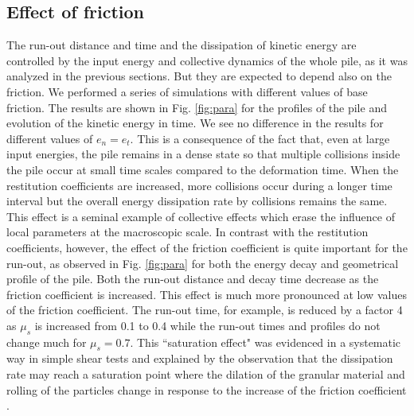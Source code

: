 \subsection{Effect of friction}
\label{sec:parameters}

The run-out distance and time and the dissipation of kinetic energy are 
controlled by the input energy and collective dynamics of the whole pile, as it 
was analyzed in the previous sections. But they are expected to depend also on 
the friction. We performed a series of simulations with different values of 
base friction. The results are shown in Fig. \ref{fig:para} for the profiles of 
the pile and evolution of the kinetic energy in time. We see no difference in 
the results for different values of $e_n = e_t$. This is a consequence of the 
fact that,  even at large input energies, the pile remains in a dense state so 
that multiple collisions inside the pile occur at small time scales compared to 
the deformation time. When the restitution coefficients are increased, more 
collisions occur during a longer time interval but the overall energy 
dissipation rate by collisions remains the same. This effect is a seminal 
example of collective effects which erase the influence of local parameters at 
the macroscopic scale. In contrast with the restitution coefficients, however, 
the effect of the friction coefficient is quite important for the run-out, as 
observed in Fig. \ref{fig:para} for both the energy decay and geometrical 
profile of the pile. Both the run-out distance and decay time decrease as the 
friction coefficient is increased. This effect is much more pronounced at low 
values of the friction coefficient. The run-out time, for example, is reduced 
by a factor 4 as $\mu_s$ is increased from 0.1 to 0.4 while the run-out times 
and profiles do not change much for $\mu_s = 0.7$. This ``saturation effect" 
was evidenced in a systematic way in simple shear tests and explained by the 
observation that the dissipation rate may reach a saturation point where the 
dilation of the granular material and rolling of the particles change in 
response to the increase of the friction coefficient \cite{Estrada2008}.

